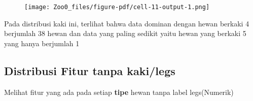 \documentclass[
  letterpaper,
]{krantz}
\begin{document}
\begin{figure}[H]

{\centering \texttt{[image: Zoo0\_files/figure-pdf/cell-11-output-1.png]}

}

\end{figure}

Pada distribusi kaki ini, terlihat bahwa data dominan dengan hewan
berkaki 4 berjumlah 38 hewan dan data yang paling sedikit yaitu hewan
yang berkaki 5 yang hanya berjumlah 1

\hypertarget{distribusi-fitur-tanpa-kakilegs}{%
\subsection{Distribusi Fitur tanpa
kaki/legs}\label{distribusi-fitur-tanpa-kakilegs}}

Melihat fitur yang ada pada setiap \textbf{tipe} hewan tanpa label
legs(Numerik)
\end{document}
